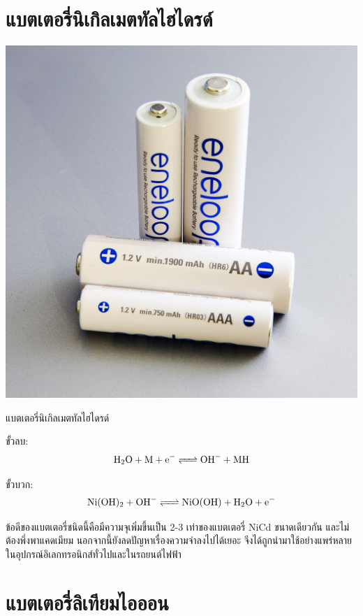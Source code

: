 \documentclass[a4paper,nobib,openany,10pt]{tufte-book}
\begin{document}
\section{แบตเตอรี่นิเกิลเมตทัลไฮไดรด์}
\label{sec:orgfe4e82c}

\begin{marginfigure}
  \centering
  \includegraphics[width=\textwidth]{pictures/nimh-battery}
\caption{แบตเตอรี่นิเกิลเมตทัลไฮไดรด์}
\end{marginfigure}

ขั้วลบ:
$$ \ce{H2O + M + e^- <=> OH^- + MH} $$

ขั้วบวก:
$$ \ce{Ni(OH)2 + OH^- <=> NiO(OH) + H2O + e^-} $$

ข้อดีของแบตเตอรี่ชนิดนี้คือมีความจุเพิ่มขึ้นเป็น 2-3 เท่าของแบตเตอรี่ NiCd ขนาดเดียวกัน และไม่ต้องพึ่งพาแคดเมียม นอกจากนี้ยังลดปัญหาเรื่องความจำลงไปได้เยอะ จึงได้ถูกนำมาใช้อย่างแพร่หลายในอุปกรณ์อิเลกทรอนิกส์ทั่วไปและในรถยนต์ไฟฟ้า

\section{แบตเตอรี่ลิเทียมไอออน}
\label{sec:org78042dc}
\end{document}

